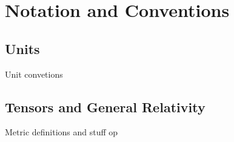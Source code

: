 
\chapter*{Notation and Conventions}

\section*{Units}

Unit convetions

\section*{Tensors and General Relativity}

Metric definitions and stuff op

\cleardoublepage